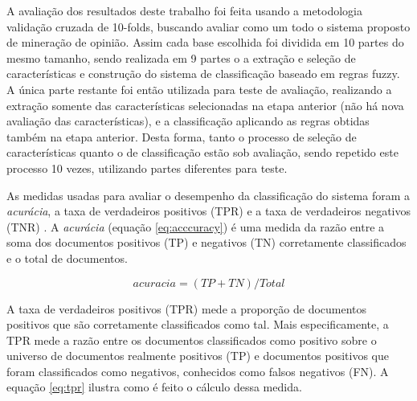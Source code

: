 \documentclass[template.tex]{subfiles}
\begin{document}
A avaliação dos resultados deste trabalho foi feita usando a metodologia validação cruzada de 10-folds, buscando avaliar como um todo o sistema proposto de mineração de opinião. Assim cada base escolhida foi dividida em 10 partes do mesmo tamanho, sendo realizada em 9 partes o a extração e seleção de características e construção do sistema de classificação baseado em regras fuzzy. A única parte restante foi então utilizada para teste de avaliação, realizando a extração somente das características selecionadas na etapa anterior (não há nova avaliação das características), e a classificação aplicando as regras obtidas também na etapa anterior. Desta forma, tanto o processo de seleção de características quanto o de classificação estão sob avaliação, sendo repetido este processo 10 vezes, utilizando partes diferentes para teste.




As medidas usadas para avaliar o desempenho da classificação do sistema foram a \textit{acurácia}, a taxa de verdadeiros positivos (TPR) e a taxa de verdadeiros negativos (TNR) \cite{fawcett2006introduction}. A \textit{acurácia} (equação \ref{eq:acccuracy}) é uma medida da razão entre a soma dos documentos positivos (TP) e negativos (TN) corretamente classificados e o total de documentos.

\begin{equation}
acuracia =  (TP + TN) / Total
\label{eq:acccuracy}
\end{equation}

A taxa de verdadeiros positivos (TPR) mede a proporção de documentos positivos que são corretamente classificados como tal. Mais especificamente, a TPR mede a razão entre os documentos classificados como positivo sobre o universo de documentos realmente positivos (TP) e documentos positivos que foram classificados como negativos, conhecidos como falsos negativos (FN). A equação \ref{eq:tpr} ilustra como é feito o cálculo dessa medida. 
\end{document}
